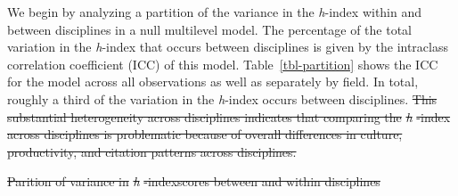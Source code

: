\documentclass[
  10pt,
  letterpaper,
]{article}
\providecommand{\DIFdeltex}[1]{{\protect\color{red}\sout{#1}}}                      %
\providecommand{\DIFdelbegin}{} %
\providecommand{\DIFdelend}{} %
\providecommand{\DIFdel}[1]{\texorpdfstring{\DIFdeltex{#1}}{}} %
\newcommand{\DIFscaledelfig}{0.5}
\newlength{\DIFdelgraphicswidth} %
\newlength{\DIFdelgraphicsheight} %
\newcommand{\DIFdelincludegraphics}[2][]{%
\sbox{\DIFdelgraphicsbox}{\DIFOincludegraphics[#1]{#2}}%
\settoboxwidth{\DIFdelgraphicswidth}{\DIFdelgraphicsbox} %
\settoboxtotalheight{\DIFdelgraphicsheight}{\DIFdelgraphicsbox} %
\scalebox{\DIFscaledelfig}{%
\parbox[b]{\DIFdelgraphicswidth}{\usebox{\DIFdelgraphicsbox}\\[-\baselineskip] \rule{\DIFdelgraphicswidth}{0em}}\llap{\resizebox{\DIFdelgraphicswidth}{\DIFdelgraphicsheight}{%
\setlength{\unitlength}{\DIFdelgraphicswidth}%
\begin{picture}(1,1)%
\thicklines\linethickness{2pt} %
{\color[rgb]{1,0,0}\put(0,0){\framebox(1,1){}}}%
{\color[rgb]{1,0,0}\put(0,0){\line( 1,1){1}}}%
{\color[rgb]{1,0,0}\put(0,1){\line(1,-1){1}}}%
\end{picture}%
}\hspace*{3pt}}} %
} %
\DeclareRobustCommand{\DIFdelbegin}{\DIFOdelbegin \let\includegraphics\DIFdelincludegraphics} %
\DeclareRobustCommand{\DIFdelend}{\DIFOaddend \let\includegraphics\DIFOincludegraphics} %
\begin{document}
We begin by analyzing a partition of the variance in the \emph{h}-index
within and between disciplines in a null multilevel model. The
percentage of the total variation in the \emph{h}-index that occurs
between disciplines is given by the intraclass correlation coefficient
(ICC) of this model. Table~\ref{tbl-partition} shows the ICC for the
model across all observations as well as separately by field. In total,
roughly a third of the variation in the \emph{h}-index occurs between
disciplines.
\DIFdelbegin \DIFdel{This substantial heterogeneity across disciplines indicates
that comparing the }\emph{\DIFdel{h}}%
\DIFdel{-index across disciplines is problematic
because of overall differences in culture, productivity, and citation
patterns across disciplines.
}\DIFdelend 

\DIFdelbegin %
{%
\DIFdel{Parition of variance in }\emph{\DIFdel{h}}%
\DIFdel{-indexscores between and within
disciplines }}%
\end{document}

